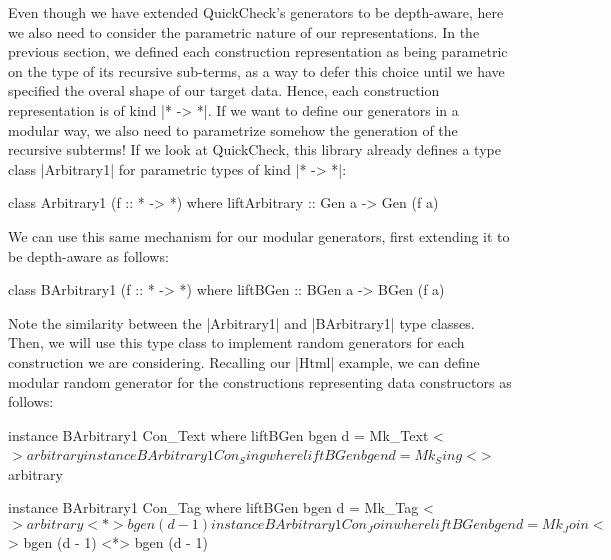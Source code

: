 Even though we have extended QuickCheck's generators to be depth-aware, here we
also need to consider the parametric nature of our representations.
%
In the previous section, we defined each construction representation as being
parametric on the type of its recursive sub-terms, as a way to defer this choice
until we have specified the overal shape of our target data.
%
Hence, each construction representation is of kind |* -> *|.
%
If we want to define our generators in a modular way, we also need to
parametrize somehow the generation of the recursive subterms!
%
If we look at QuickCheck, this library already defines a type class |Arbitrary1|
for parametric types of kind |* -> *|:

\begin{code}
class Arbitrary1 (f :: * -> *) where
  liftArbitrary :: Gen a -> Gen (f a)
\end{code}



%
We can use this same mechanism for our modular generators, first extending it to
be depth-aware as follows:

\begin{code}
class BArbitrary1 (f :: * -> *) where
  liftBGen :: BGen a -> BGen (f a)
\end{code}
%
Note the similarity between the |Arbitrary1| and |BArbitrary1| type classes.
%
Then, we will use this type class to implement random generators for each
construction we are considering.
%
Recalling our |Html| example, we can define modular random generator for the
constructions representing data constructors as follows:

\begin{code}
instance BArbitrary1 Con_Text where
  liftBGen bgen d = Mk_Text <$> arbitrary

instance BArbitrary1 Con_Sing where
  liftBGen bgen d = Mk_Sing <$> arbitrary

instance BArbitrary1 Con_Tag where
  liftBGen bgen d = Mk_Tag <$> arbitrary <*> bgen (d - 1)

instance BArbitrary1 Con_Join where
  liftBGen bgen d = Mk_Join <$> bgen (d - 1) <*> bgen (d - 1)
\end{code} %

